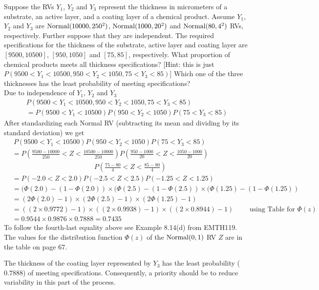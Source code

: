 \begin{ExerciseList}
\Exercise
Suppose the RVs $Y_1$, $Y_2$ and $Y_3$ represent the thickness in micrometers of a substrate, an active layer, and a coating layer of a chemical product.  
Assume $Y_1$, $Y_2$ and $Y_3$ are $\mbox{{\rm Normal}}(10000,250^2)$, $\mbox{{\rm Normal}}(1000,20^2)$ and $\mbox{{\rm Normal}}(80,4^2)$ RVs, respectively.  
Further suppose that they are independent.  
The required specifications for the thickness of the substrate, active layer and coating layer are $[9500,10500]$, $[950,1050]$ and $[75,85]$, respectively.  
What proportion of chemical products meets all thickness specifications? [Hint: this is just $P(9500<Y_1<10500,950<Y_2<1050,75<Y_3<85)$]  Which one of the three thicknesses has the least probability of meeting specifications?   
\Answer
~\\
Due to independence of $Y_1$, $Y_2$ and $Y_3$
\begin{multline*}
P(9500<Y_1<10500,950<Y_2<1050,75<Y_3<85)\\ = P(9500<Y_1<10500) P(950<Y_2<1050) P(75<Y_3<85)
\end{multline*}
After standardizing each Normal RV (subtracting its mean and dividing by its standard deviation) we get
\begin{align*}
&~ P(9500<Y_1<10500) P(950<Y_2<1050) P(75<Y_3<85)\\
&=  P\left(\frac{9500-10000}{250}< Z < \frac{10500-10000}{250} \right) P\left( \frac{950-1000}{20}<Z<\frac{1050-1000}{20}\right)\\
&\qquad \qquad \qquad \qquad \qquad \qquad P\left(\frac{75-80}{4}<Z<\frac{85-80}{4}\right)\\
&= P(-2.0<Z<2.0) P(-2.5<Z<2.5) P(-1.25<Z<1.25) \\
&= (\Phi(2.0)-(1-\Phi(2.0)) \times (\Phi(2.5)-(1-\Phi(2.5)) \times (\Phi(1.25)-(1-\Phi(1.25))\\
&= (2\Phi(2.0)-1) \times (2\Phi(2.5)-1) \times (2\Phi(1.25)-1)\\
&= ((2 \times 0.9772) -1) \times ((2 \times 0.9938) - 1) \times ((2 \times 0.8944)-1) \qquad \text{ using Table for $\Phi(z)$} \\
&= 0.9544 \times 0.9876 \times 0.7888 = 0.7435
\end{align*}
To follow the fourth-last equality above see Example 8.14(d) from EMTH119.  The values for the distribution function $\Phi(z)$ of the $\mbox{{\rm Normal}}(0,1)$ RV $Z$ are in the table on page 67. 

The thickness of the coating layer represented by $Y_3$ has the least probability ($0.7888$) of meeting specifications.  Consequently, a priority should be to reduce variability in this part of the process.


\end{ExerciseList}
